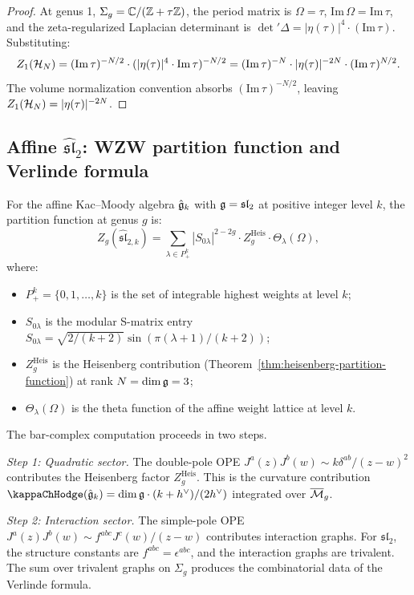 \begin{proof}
At genus 1, $\Sigma_g = \mathbb{C} / (\mathbb{Z} + \tau \mathbb{Z})$, the period matrix is
$\Omega = \tau$, $\mathrm{Im}\, \Omega = \mathrm{Im}\, \tau$, and the
zeta-regularized Laplacian determinant is $\det{}' \Delta = |\eta(\tau)|^4
\cdot (\mathrm{Im}\, \tau)$. Substituting:
\[
Z_1(\mathcal{H}_N)
 = (\mathrm{Im}\, \tau)^{-N/2}
 \cdot (|\eta(\tau)|^4 \cdot \mathrm{Im}\, \tau)^{-N/2}
 = (\mathrm{Im}\, \tau)^{-N}
 \cdot |\eta(\tau)|^{-2N}
 \cdot (\mathrm{Im}\, \tau)^{N/2}.
\]
The volume normalization convention absorbs $(\mathrm{Im}\,
\tau)^{-N/2}$, leaving $Z_1(\mathcal{H}_N) = |\eta(\tau)|^{-2N}$.
\end{proof}

\subsection{Affine $\widehat{\mathfrak{sl}}_2$: WZW partition function and Verlinde formula}

\begin{construction}
For the affine Kac--Moody algebra $\hat{\mathfrak{g}}_k$ with $\mathfrak{g} =
\mathfrak{sl}_2$ at positive integer level $k$, the partition function
at genus $g$ is:
\[
Z_g(\hat{\mathfrak{sl}}_{2,k})
 = \sum_{\lambda \in P^k_+}
 |S_{0\lambda}|^{2-2g} \cdot Z^{\mathrm{Heis}}_g
 \cdot \Theta_\lambda(\Omega),
\]
where:
\begin{itemize}
\item $P^k_+ = \{0, 1, \ldots, k\}$ is the set of integrable
 highest weights at level $k$;
\item $S_{0\lambda}$ is the modular S-matrix entry
 $S_{0\lambda} = \sqrt{2/(k+2)} \sin(\pi(\lambda+1)/(k+2))$;
\item $Z^{\mathrm{Heis}}_g$ is the Heisenberg contribution
 (Theorem~\ref{thm:heisenberg-partition-function}) at rank $N = \dim \mathfrak{g}
 = 3$;
\item $\Theta_\lambda(\Omega)$ is the theta function of the affine
 weight lattice at level $k$.
\end{itemize}

The bar-complex computation proceeds in two steps.

\emph{Step 1: Quadratic sector.} The double-pole OPE
$J^a(z) J^b(w) \sim k \delta^{ab}/(z-w)^2$ contributes the Heisenberg
factor $Z^{\mathrm{Heis}}_g$. This is the curvature contribution
$\kappaChHodge(\hat{\fg}_k) = \dim \fg \cdot (k + h^\vee) / (2h^\vee)$ integrated over
$\overline{\mathcal{M}}_g$.

\emph{Step 2: Interaction sector.} The simple-pole OPE
$J^a(z) J^b(w) \sim f^{abc} J^c(w)/(z-w)$ contributes interaction
graphs. For $\mathfrak{sl}_2$, the structure constants are
$f^{abc} = \epsilon^{abc}$, and the interaction graphs are trivalent.
The sum over trivalent graphs on $\Sigma_g$ produces the combinatorial
data of the Verlinde formula.
\end{construction}

